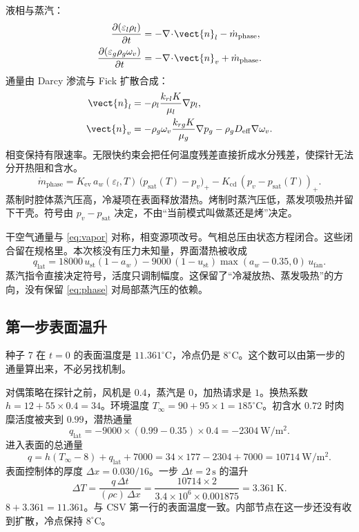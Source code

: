 液相与蒸汽：
\begin{align}
\label{eq:liquid}
\frac{\partial(\varepsilon_l\rho_l)}{\partial t}
&=-\nabla\!\cdot\!\vect{n}_l-\dot m_{\mathrm{phase}},\\
\label{eq:vapor}
\frac{\partial(\varepsilon_g\rho_g\omega_v)}{\partial t}
&=-\nabla\!\cdot\!\vect{n}_v+\dot m_{\mathrm{phase}}.
\end{align}
通量由 Darcy 渗流与 Fick 扩散合成：
\begin{align}
\vect{n}_l&=-\rho_l\frac{k_{rl}K}{\mu_l}\nabla p_l,\\
\vect{n}_v&=-\rho_g\omega_v\frac{k_{rg}K}{\mu_g}\nabla p_g
-\rho_g D_{\mathrm{eff}}\nabla\omega_v.
\end{align}
相变保持有限速率。无限快约束会把任何温度残差直接折成水分残差，使探针无法分开热阻和含水。
\begin{equation}
\label{eq:phase}
\dot m_{\mathrm{phase}}
=K_{\mathrm{ev}}\,a_w(\varepsilon_l,T)\,
\big(p_{\mathrm{sat}}(T)-p_v\big)_+
-K_{\mathrm{cd}}\,(p_v-p_{\mathrm{sat}}(T))_+.
\end{equation}
蒸制时腔体蒸汽压高，冷凝项在表面释放潜热。烤制时蒸汽压低，蒸发项吸热并留下干壳。符号由 \(p_v-p_{\mathrm{sat}}\) 决定，不由“当前模式叫做蒸还是烤”决定。

干空气通量与 \eqref{eq:vapor} 对称，相变源项改号。气相总压由状态方程闭合。这些闭合留在规格里。本次核没有压力未知量，界面潜热被收成
\begin{equation}
q_{\mathrm{lat}}=18000\,u_{\mathrm{st}}(1-a_w)-9000\,(1-u_{\mathrm{st}})\max(a_w-0.35,0)\,u_{\mathrm{fan}}.
\end{equation}
蒸汽指令直接决定符号，活度只调制幅度。这保留了“冷凝放热、蒸发吸热”的方向，没有保留 \eqref{eq:phase} 对局部蒸汽压的依赖。

\subsection{第一步表面温升}

种子 7 在 \(t=0\) 的表面温度是 \(11.361^\circ\mathrm{C}\)，冷点仍是 \(8^\circ\mathrm{C}\)。这个数可以由第一步的通量算出来，不必另找机制。

对偶策略在探针之前，风机是 \(0.4\)，蒸汽是 \(0\)，加热请求是 \(1\)。换热系数 \(h=12+55\times 0.4=34\)。环境温度 \(T_\infty=90+95\times 1=185^\circ\mathrm{C}\)。初含水 \(0.72\) 时肉糜活度被夹到 \(0.99\)，潜热通量
\[
q_{\mathrm{lat}}=-9000\times(0.99-0.35)\times 0.4=-2304\ \mathrm{W}/\mathrm{m}^2.
\]
进入表面的总通量
\[
q=h(T_\infty-8)+q_{\mathrm{lat}}+7000=34\times 177-2304+7000=10714\ \mathrm{W}/\mathrm{m}^2.
\]
表面控制体的厚度 \(\Delta x=0.030/16\)。一步 \(\Delta t=2\,\mathrm{s}\) 的温升
\[
\Delta T=\frac{q\,\Delta t}{(\rho c)\,\Delta x}=\frac{10714\times 2}{3.4\times 10^{6}\times 0.001875}=3.361\ \mathrm{K}.
\]
\(8+3.361=11.361\)。与 CSV 第一行的表面温度一致。内部节点在这一步还没有收到扩散，冷点保持 \(8^\circ\mathrm{C}\)。

